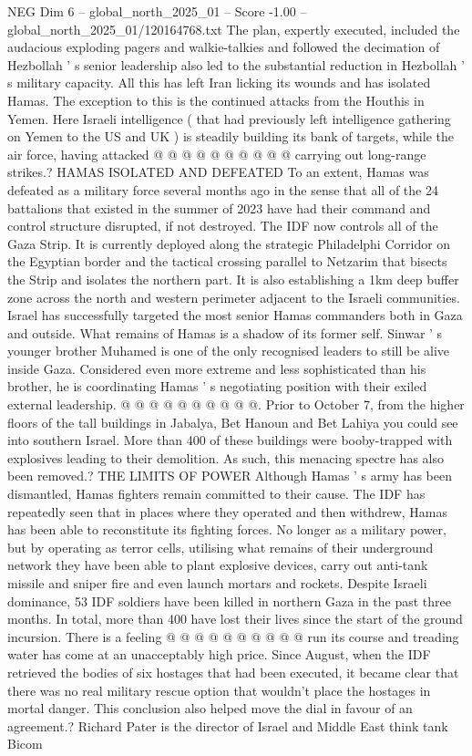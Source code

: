 \begin{textsample}{NEG Dim 6 – global\_north\_2025\_01 – Score -1.00 – global\_north\_2025\_01/120164768.txt}
The plan, expertly executed, included the audacious exploding pagers and walkie-talkies and followed the decimation of Hezbollah ' s senior leadership also led to the substantial reduction in Hezbollah ' s military capacity.
All this has left Iran licking its wounds and has isolated Hamas.
The exception to this is the continued attacks from the Houthis in Yemen.
Here Israeli intelligence ( that had previously left intelligence gathering on Yemen to the US and UK ) is steadily building its bank of targets, while the air force, having attacked @ @ @ @ @ @ @ @ @ @ carrying out long-range strikes.?
HAMAS ISOLATED AND DEFEATED To an extent, Hamas was defeated as a military force several months ago in the sense that all of the 24 battalions that existed in the summer of 2023 have had their command and control structure disrupted, if not destroyed.
The IDF now controls all of the Gaza Strip.
It is currently deployed along the strategic Philadelphi Corridor on the Egyptian border and the tactical crossing parallel to Netzarim that bisects the Strip and isolates the northern part.
It is also establishing a 1km deep buffer zone across the north and western perimeter adjacent to the Israeli communities.
Israel has successfully targeted the most senior Hamas commanders both in Gaza and outside.
What remains of Hamas is a shadow of its former self.
Sinwar ' s younger brother Muhamed is one of the only recognised leaders to still be alive inside Gaza.
Considered even more extreme and less sophisticated than his brother, he is coordinating Hamas ' s negotiating position with their exiled external leadership. @ @ @ @ @ @ @ @ @ @.
Prior to October 7, from the higher floors of the tall buildings in Jabalya, Bet Hanoun and Bet Lahiya you could see into southern Israel.
More than 400 of these buildings were booby-trapped with explosives leading to their demolition.
As such, this menacing spectre has also been removed.?
THE LIMITS OF POWER Although Hamas ' s army has been dismantled, Hamas fighters remain committed to their cause.
The IDF has repeatedly seen that in places where they operated and then withdrew, Hamas has been able to reconstitute its fighting forces.
No longer as a military power, but by operating as terror cells, utilising what remains of their underground network they have been able to plant explosive devices, carry out anti-tank missile and sniper fire and even launch mortars and rockets.
Despite Israeli dominance, 53 IDF soldiers have been killed in northern Gaza in the past three months.
In total, more than 400 have lost their lives since the start of the ground incursion.
There is a feeling @ @ @ @ @ @ @ @ @ @ run its course and treading water has come at an unacceptably high price.
Since August, when the IDF retrieved the bodies of six hostages that had been executed, it became clear that there was no real military rescue option that wouldn't place the hostages in mortal danger.
This conclusion also helped move the dial in favour of an agreement.?
Richard Pater is the director of Israel and Middle East think tank Bicom

\end{textsample}
